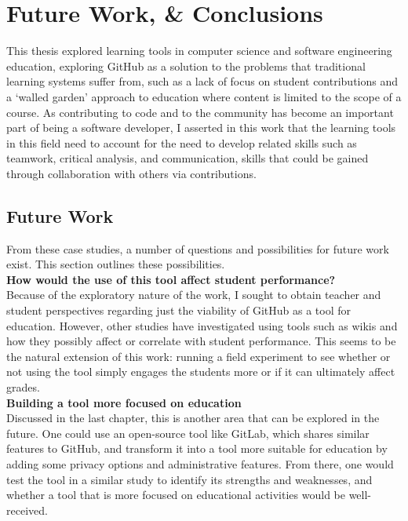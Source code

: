 \chapter{Future Work, \& Conclusions}

This thesis explored learning tools in computer science and software engineering education, exploring GitHub as a solution to the problems that traditional learning systems suffer from, such as a lack of focus on student contributions and a `walled garden' approach to education where content is limited to the scope of a course. As contributing to code and to the community has become an important part of being a software developer, I asserted in this work that the learning tools in this field need to account for the need to develop related skills such as teamwork, critical analysis, and communication, skills that could be gained through collaboration with others via contributions.

\section{Future Work}
From these case studies, a number of questions and possibilities for future work exist. This section outlines these possibilities. \\

\textbf{How would the use of this tool affect student performance?} \\
Because of the exploratory nature of the work, I sought to obtain teacher and student perspectives regarding just the viability of GitHub as a tool for education. However, other studies have investigated using tools such as wikis \cite{minocha2007collaborative} and how they possibly affect or correlate with student performance. This seems to be the natural extension of this work: running a field experiment to see whether or not using the tool simply engages the students more or if it can ultimately affect grades. \\

\textbf{Building a tool more focused on education} \\
Discussed in the last chapter, this is another area that can be explored in the future. One could use an open-source tool like GitLab, which shares similar features to GitHub, and transform it into a tool more suitable for education by adding some privacy options and administrative features. From there, one would test the tool in a similar study to identify its strengths and weaknesses, and whether a tool that is more focused on educational activities would be well-received. \\

